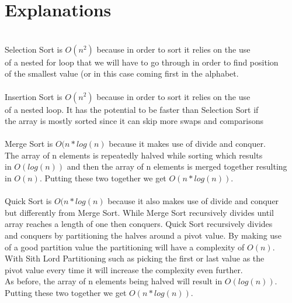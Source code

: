 \documentclass[letterpaper, 10pt]{article}
\begin{document}
\section{Explanations}
\noindent
\\
Selection Sort is $O(n^2)$ because in order to sort it relies on the use\\
of a nested for loop that we will have to go through in order to find position\\ of the smallest value (or in this case coming first in the alphabet.\\
\\
Insertion Sort is $O(n^2)$ because in order to sort it relies on the use\\
of a nested loop. It has the potential to be faster than Selection Sort if\\
the array is mostly sorted since it can skip more swaps and comparisons\\
\\
Merge Sort is $O(n*log(n)$ because it makes use of divide and conquer.\\
The array of n elements is repeatedly halved while sorting which results\\ 
in $O(log(n))$ and then the array of n elements is merged together resulting\\
in $O(n)$. Putting these two together we get $O(n*log(n))$.\\
\\
Quick Sort is $O(n*log(n)$ because it also makes use of divide and conquer\\
but differently from Merge Sort. While Merge Sort recursively divides until\\ array reaches a length of one then conquers. Quick Sort recursively divides \\
and conquers by partitioning the halves around a pivot value. By making use \\
of a good partition value the partitioning will have a complexity of $O(n)$.\\
With Sith Lord Partitioning such as picking the first or last value as the\\
pivot value every time it will increase the complexity even further.\\
As before, the array of n elements being halved will result in $O(log(n))$.\\
Putting these two together we get $O(n*log(n))$.\\
\end{document}
